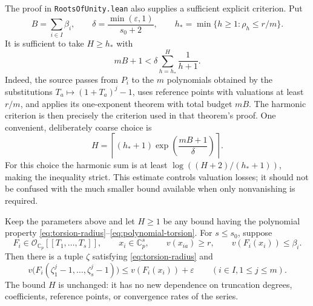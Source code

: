 The proof in \texttt{RootsOfUnity.lean} also supplies a sufficient explicit
criterion.  Put
\[
 B=\sum_{i\in I}\beta_i,\qquad
 \delta=\frac{\min(\varepsilon,1)}{s_0+2},\qquad
 h_* =\min\{h\geq1:\rho_h\leq r/m\}.
\]
It is sufficient to take $H\geq h_*$ with
\begin{equation}
 mB+1<\delta\sum_{h=h_*}^{H}\frac1{h+1}.
 \label{eq:harmonic-bound}
\end{equation}
Indeed, the source passes from $P_i$ to the $m$ polynomials obtained by the
substitutions $T_a\mapsto(1+T_a)^j-1$, uses reference points with valuations
at least $r/m$, and applies its one-exponent theorem with total budget $mB$.
The harmonic criterion is then precisely the criterion used in that theorem's
proof.  One convenient, deliberately coarse choice is
\begin{equation}
 H=\left\lceil(h_*+1)\exp\!\left(\frac{mB+1}{\delta}\right)\right\rceil.
 \label{eq:explicit-harmonic-depth}
\end{equation}
For this choice the harmonic sum is at least
$\log((H+2)/(h_*+1))$, making the inequality strict.
This estimate controls valuation losses; it should not be confused with the
much smaller bound available when only nonvanishing is required.

\begin{theorem}
\label{thm:series-same-bound}
Keep the parameters above and let $H\geq1$ be any bound having the polynomial
property \eqref{eq:torsion-radius}--\eqref{eq:polynomial-torsion}.
For $s\leq s_0$, suppose
\[
 F_i\in\mathcal O_{\mathbb C_p}[[T_1,\ldots,T_s]],\qquad
 x_i\in\mathbb C_p^s,\qquad
 v(x_{ia})\geq r,\qquad v(F_i(x_i))\leq\beta_i.
\]
Then there is a tuple $\zeta$ satisfying \eqref{eq:torsion-radius} and
\begin{equation}
 v\bigl(F_i(\zeta_1^j-1,\ldots,\zeta_s^j-1)\bigr)
 \leq v(F_i(x_i))+\varepsilon
 \qquad(i\in I, 1\leq j\leq m).
 \label{eq:series-torsion}
\end{equation}
The bound $H$ is unchanged: it has no new dependence on truncation degrees,
coefficients, reference points, or convergence rates of the series.
\end{theorem}

